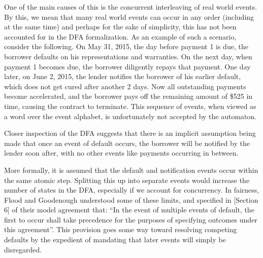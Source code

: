 \documentclass{article}
\begin{document}




One of the main causes of this is the concurrent interleaving of real
world events.
By this, we mean that many real world events can occur in any order (including
at the same time) and
perhaps for the sake of simplicity, this has not been accounted for in the DFA
formalization.
As an example of such a scenario, consider the following.
On May 31, 2015, the day before payment 1 is due, the borrower defaults on his
representations and warranties.
On the next day, when payment 1 becomes due, the borrower diligently
repays that payment.
One day later, on June 2, 2015, the lender notifies the borrower of his
earlier default, which does not get cured after another 2 days.
Now all outstanding payments become accelerated, and the borrower pays off
the remaining amount of \$525 in time, causing the contract to terminate.
This sequence of events, when viewed as a word over the event alphabet, is
unfortunately not accepted by the automaton.

Closer inspection of the DFA suggests that there is an
implicit assumption being made that once an event of default occurs,
the borrower will be notified by the lender soon after, with no other events
like payments occurring in between.

More formally, it is assumed that the default and notification events occur
within the same atomic step.
Splitting this up into separate events would increase the number of states in
the DFA, especially if we account for concurrency.
In fairness, Flood and Goodenough understood some of these limits, and specified
in \cite{contract_as_automaton}[Section 6] of their model agreement that:
``In the event of multiple events of default, the first to occur shall take
precedence for the purposes of specifying outcomes under this agreement''.
This provision goes some way toward resolving competing defaults by the
expedient of mandating that later events will simply be disregarded.
\end{document}
